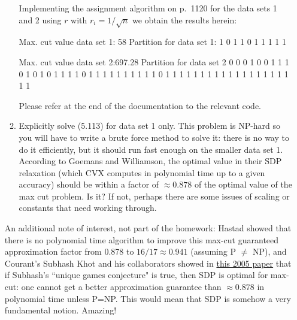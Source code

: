 \documentclass[11pt]{article}
\begin{document}
\begin{enumerate}
\begin{enumerate}
Implementing the assignment algorithm on p.~1120 for the data sets 1 and 2 using $r$ with $r_i=1/\sqrt{n}$ we obtain the results herein:

Max. cut value data set 1: 58
Partition for data set 1:
	1     0     1     1     0     1     1     1     1     1

Max. cut value data set 2:697.28
Partition for data set 2
     0     0     0     1     0     0     1     1     1     0     1     0     1     0     1
     1     1     1     0     1     1     1     1     1     1     1     1     1     1     0
     1     1     1     1     1     1     1     1     1     1     1     1     1     1     1
     1     1     1     1     1
     
 Please refer at the end of the documentation to the relevant code.
      
 \item Explicitly solve (5.113) for data set 1 only.
 This problem is NP-hard so you will have to write a brute force method to solve it: there is no way to do it efficiently, but it should
 run fast enough on the smaller data set 1. According to Goemans and Williamson,
 the optimal value in their SDP relaxation (which CVX computes in polynomial time up to a given accuracy)
 should be within a factor of $\approx 0.878$ of the optimal value of the max cut problem. Is it? If not, perhaps there are some issues of scaling
 or constants that need working through. 
 \end{enumerate}
 
 An additional note of interest, not part of the homework: 
Hastad showed that there is no polynomial time algorithm to improve
 this max-cut guaranteed approximation factor from 0.878 to $16/17\approx 0.941$ (assuming P $\not =$ NP), and 
 Courant's Subhash Khot and his collaborators showed in 
 \href{https://www.cs.cmu.edu/~odonnell/papers/maxcut.pdf}{this 2005 paper} that if Subhash's ``unique games conjecture" is true, then SDP is optimal for max-cut: one cannot get a better approximation
guarantee than $\approx 0.878$ in polynomial time unless P=NP. 
This would mean that SDP is somehow a very fundamental notion. Amazing!
 
\end{enumerate}
\end{document}
